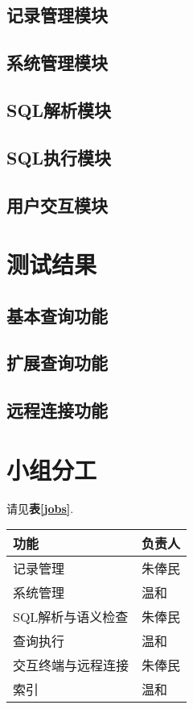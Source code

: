 \documentclass[11pt, a4paper]{article}
\makeatletter
\newcommand\tcaption{\def\@captype{table}\caption}
\newcommand{\tref}[1]{\textbf{表\ref{#1}}}
\makeatother
\begin{document}
\subsection{记录管理模块}

\subsection{系统管理模块}

\subsection{SQL解析模块}

\subsection{SQL执行模块}

\subsection{用户交互模块}

\section{测试结果}

\subsection{基本查询功能}

\subsection{扩展查询功能}

\subsection{远程连接功能}

\section{小组分工}

请见\tref{jobs}.

\begin{center}
    \tcaption{小组分工}\label{jobs}
    \begin{tabular}{ll}
        \toprule
        功能 & 负责人 \\
        \midrule
        记录管理 & 朱俸民 \\
        系统管理 & 温和 \\
        SQL解析与语义检查 & 朱俸民 \\
        查询执行 & 温和 \\
        交互终端与远程连接 & 朱俸民 \\
        索引 & 温和 \\
        \bottomrule
    \end{tabular}
\end{center}
\end{document}
